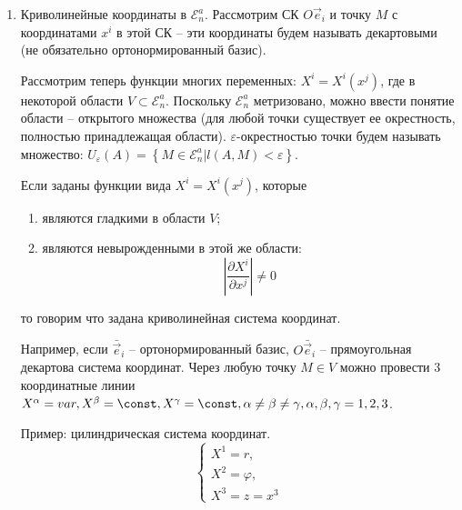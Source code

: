 \begin{enumerate}
  \item Криволинейные координаты в $\mathcal{E}_n^a$. Рассмотрим СК $O\vec{e}_i$ и точку $M$ с
    координатами $x^i$ в этой СК -- эти координаты будем называть декартовыми (не обязательно
    ортонормированный базис).
    
    \begin{figure}[H]
    	\centering
    	
    \end{figure}
    
    Рассмотрим теперь функции многих переменных: $X^i = X^i (x^j)$, где в некоторой области
    $V \subset \mathcal{E}_n^a$. Поскольку $\mathcal{E}_n^a$ метризовано, можно ввести понятие 
    области -- открытого множества (для любой точки существует ее окрестность, полностью
    принадлежащая области). $\varepsilon$-окрестностью точки будем называть множество:
    $U_\varepsilon(A) = \left\{ M \in \mathcal{E}_n^a | l(A, M) < \varepsilon \right\} $.
    
    \begin{figure}[H]
    	\centering
    	
    \end{figure}
    
    Если заданы функции вида $X^i = X^i (x^j)$, которые
    \begin{enumerate}
      \item являются гладкими в области $V$;
      \item являются невырожденными в этой же области:
        \[
          \left| \dfrac{\partial X^i}{\partial x^j} \right| \neq 0
        \]
    \end{enumerate}
    то говорим что задана криволинейная система координат.
  
    Например, если $\bar{\vec{e}}_i$ -- ортонормированный базис, $O\bar{\vec{e}}_i$ -- прямоугольная
    декартова система координат. Через любую точку $M \in V$ можно провести 3 координатные линии
    $X^\alpha = var, X^{\beta} = \const, X^\gamma = \const, \alpha \neq \beta \neq \gamma, \alpha, \beta, \gamma = 1, 2, 3$.

    Пример: цилиндрическая система координат. 
    \[
      \begin{cases}
        X^1 = r, \\
        X^2 = \varphi, \\
        X^3 = z = x^3
      \end{cases}
    \]


\end{enumerate}
